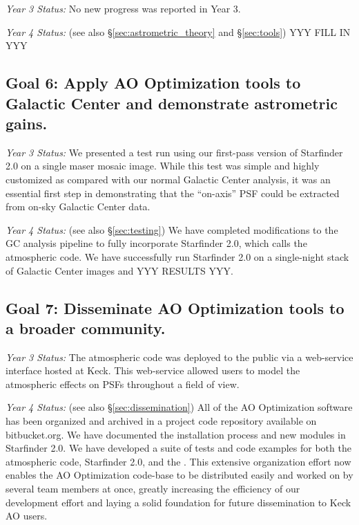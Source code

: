 \noindent
\textit{Year 3 Status:}
No new progress was reported in Year 3.

\noindent
\textit{Year 4 Status:}
(see also \S\ref{sec:astrometric_theory} and \S\ref{sec:tools})
YYY FILL IN YYY

\subsection{Goal 6: Apply AO Optimization tools to Galactic Center and demonstrate
  astrometric gains.}

\noindent
\textit{Year 3 Status:}
We presented a test run using our first-pass version of Starfinder
2.0 on a single maser mosaic image. While this test was simple and highly
customized as compared with our normal Galactic Center
analysis, it was an essential first step in demonstrating that the
``on-axis'' PSF could be extracted from on-sky Galactic Center data.
 
\noindent
\textit{Year 4 Status:}
(see also \S\ref{sec:testing})
 We have completed modifications to the GC analysis pipeline to fully
incorporate Starfinder 2.0, which calls the atmospheric code. We have
successfully run Starfinder 2.0 on a single-night stack of Galactic
Center images and YYY RESULTS YYY.


\subsection{Goal 7: Disseminate AO Optimization tools to a broader community.}

\noindent
\textit{Year 3 Status:}
The atmospheric code was deployed to the public via a web-service
interface hosted at Keck. This web-service allowed users to model
the atmospheric effects on PSFs throughout a field of view. 

\noindent
\textit{Year 4 Status:}
(see also \S\ref{sec:dissemination})
All of the AO Optimization software has been organized and archived in
a project code repository available on bitbucket.org. We have
documented the installation process and new modules in Starfinder
2.0. We have developed a suite of tests and code examples for both the
atmospheric code, Starfinder 2.0, and the . This extensive
organization effort now enables the AO Optimization code-base to be
distributed easily and worked on by several team members at once,
greatly increasing the efficiency of our development effort and laying
a solid foundation for future dissemination to Keck AO users.


  
  
  
  